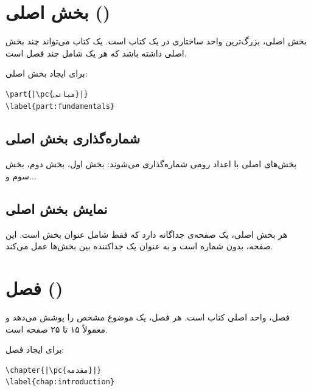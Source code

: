 \section{بخش اصلی ()}
\label{sec:chapters-part}

بخش اصلی، بزرگ‌ترین واحد ساختاری در یک کتاب
است. یک کتاب می‌تواند چند بخش اصلی داشته باشد
که هر یک شامل چند فصل است.

برای ایجاد بخش اصلی:

\begin{latin}
\begin{verbatim}
\part{|\pc{مبانی}|}
\label{part:fundamentals}
\end{verbatim}
\end{latin}


\subsection{شماره‌گذاری بخش اصلی}
\label{sec:chapters-part-numbering}

بخش‌های اصلی با اعداد رومی شماره‌گذاری می‌شوند:
بخش اول، بخش دوم، بخش سوم و...

\subsection{نمایش بخش اصلی}
\label{sec:chapters-part-display}

هر بخش اصلی، یک صفحه‌ی جداگانه دارد که فقط
شامل عنوان بخش است. این صفحه، بدون شماره
است و به عنوان یک جداکننده بین بخش‌ها عمل
می‌کند.


\section{فصل ()}
\label{sec:chapters-chapter}

فصل، واحد اصلی کتاب است. هر فصل، یک موضوع
مشخص را پوشش می‌دهد و معمولاً ۱۵ تا ۲۵ صفحه
است.

برای ایجاد فصل:

\begin{latin}
\begin{verbatim}
\chapter{|\pc{مقدمه}|}
\label{chap:introduction}
\end{verbatim}
\end{latin}

